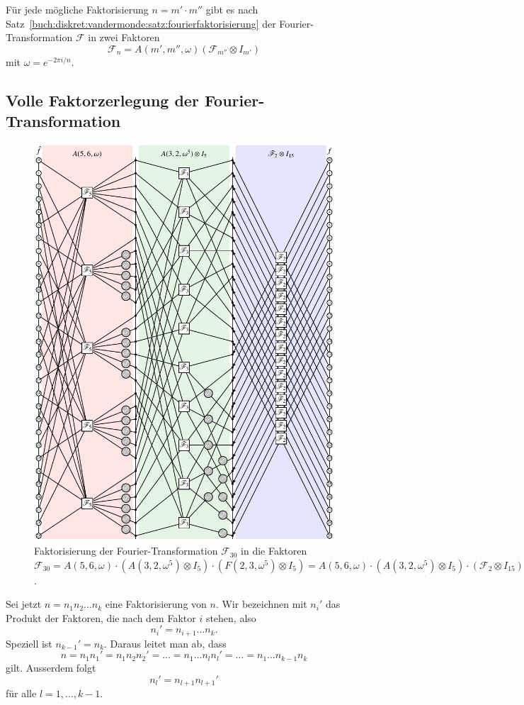 Für jede mögliche Faktorisierung $n=m'\cdot m''$ gibt es nach
Satz~\ref{buch:diskret:vandermonde:satz:fourierfaktorisierung}
der Fourier-Transformation $\mathscr{F}$ in zwei Faktoren
\[
\mathscr{F}_n
=
A(m',m'',\omega) (\mathscr{F}_{m''} \otimes I_{m'})
\]
mit $\omega=e^{-2\pi i/n}$.

%
%
\subsection{Volle Faktorzerlegung der Fourier-Transformation
\label{buch:diskret:schnell:subsection:fourierfaktorisierung}}
\begin{figure}
\centering
\includegraphics{chapters/060-diskret/images/f30.pdf}
\caption{Faktorisierung der Fourier-Transformation
$\mathscr{F}_{30}$ in die Faktoren
$\mathscr{F}_{30}
=
A(5,6,\omega)
\cdot
(A(3,2,\omega^5)\otimes I_5)
\cdot
(F(2,3,\omega^5)\otimes I_5)
=
A(5,6,\omega)
\cdot
(A(3,2,\omega^5)\otimes I_5)
\cdot
(\mathscr{F}_2\otimes I_{15})
$.
\label{buch:diskret:faktorisierung:fig:f30}}
\end{figure}
Sei jetzt $n=n_1n_2\dots n_k$ eine Faktorisierung von $n$.
Wir bezeichnen mit $n_i'$ das Produkt der Faktoren, die nach dem Faktor
$i$ stehen, also
\[
n_i'
= 
n_{i+1}\dots n_k.
\]
Speziell ist $n_{k-1}'=n_k$.
Daraus leitet man ab, dass
\[
n
=
n_1n_1'
=
n_1n_2n_2'
=
\ldots
=
n_1\dots n_ln_l'
=
\dots = n_1\dots n_{k-1}n_k
\]
gilt.
Ausserdem folgt
\[
n_l'
=
n_{l+1}n_{l+1}'
\]
für alle $l=1,\dots,k-1$.

